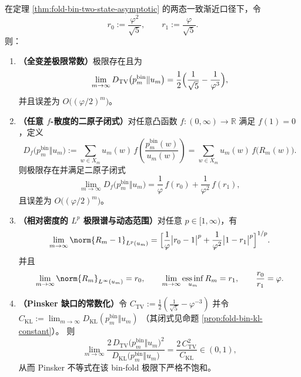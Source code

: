 \begin{theorem}\label{thm:xi-foldbin-pushforward-uniform-two-atom-ledger}
在定理 \ref{thm:fold-bin-two-state-asymptotic} 的两态一致渐近口径下，令
\[
r_0:=\frac{\varphi^2}{\sqrt5},\qquad r_1:=\frac{\varphi}{\sqrt5}.
\]
则：
\begin{enumerate}
  \item \textbf{（全变差极限常数）}极限存在且为
  \[
  \lim_{m\to\infty}D_{\mathrm{TV}}\bigl(p^{\mathrm{bin}}_m\Vert u_m\bigr)
  =\frac12\Bigl(\frac{1}{\sqrt5}-\frac{1}{\varphi^3}\Bigr),
  \]
  并且误差为 \(O\bigl((\varphi/2)^m\bigr)\)。
  \item \textbf{（任意 \(f\)-散度的二原子闭式）}对任意凸函数 \(f:(0,\infty)\to\mathbb R\) 满足 \(f(1)=0\)，定义
  \[
  D_f\bigl(p^{\mathrm{bin}}_m\Vert u_m\bigr)
  :=\sum_{w\in X_m}u_m(w)\,f\!\left(\frac{p^{\mathrm{bin}}_m(w)}{u_m(w)}\right)
  =\sum_{w\in X_m}u_m(w)\,f\!\bigl(R_m(w)\bigr).
  \]
  则极限存在并满足二原子闭式
  \[
  \lim_{m\to\infty}D_f\bigl(p^{\mathrm{bin}}_m\Vert u_m\bigr)
  =\frac{1}{\varphi}\,f(r_0)+\frac{1}{\varphi^2}\,f(r_1),
  \]
  且误差为 \(O\bigl((\varphi/2)^m\bigr)\)。
  \item \textbf{（相对密度的 \(L^p\) 极限谱与动态范围）}对任意 \(p\in[1,\infty)\)，有
  \[
  \lim_{m\to\infty}\norm{R_m-1}_{L^p(u_m)}
  =
  \Bigl[\frac{1}{\varphi}\bigl|r_0-1\bigr|^p+\frac{1}{\varphi^2}\bigl|1-r_1\bigr|^p\Bigr]^{1/p}.
  \]
  并且
  \[
  \lim_{m\to\infty}\norm{R_m}_{L^\infty(u_m)}=r_0,\qquad
  \lim_{m\to\infty}\operatorname*{ess\,inf}_{u_m}R_m=r_1,
  \qquad
  \frac{r_0}{r_1}=\varphi.
  \]
  \item \textbf{（Pinsker 缺口的常数化）}令
  \(
  C_{\mathrm{TV}}:=\frac12(\frac{1}{\sqrt5}-\varphi^{-3})
  \)
  并令
  \(
  C_{\mathrm{KL}}:=\lim_{m\to\infty}D_{\mathrm{KL}}(p^{\mathrm{bin}}_m\Vert u_m)
  \)
  （其闭式见命题 \ref{prop:fold-bin-kl-constant}）。
  则
  \[
  \lim_{m\to\infty}\frac{2\,D_{\mathrm{TV}}\bigl(p^{\mathrm{bin}}_m\Vert u_m\bigr)^2}{D_{\mathrm{KL}}\bigl(p^{\mathrm{bin}}_m\Vert u_m\bigr)}
  =\frac{2\,C_{\mathrm{TV}}^2}{C_{\mathrm{KL}}}\in(0,1),
  \]
  从而 Pinsker 不等式在该 bin-fold 极限下严格不饱和。
\end{enumerate}
\end{theorem}

